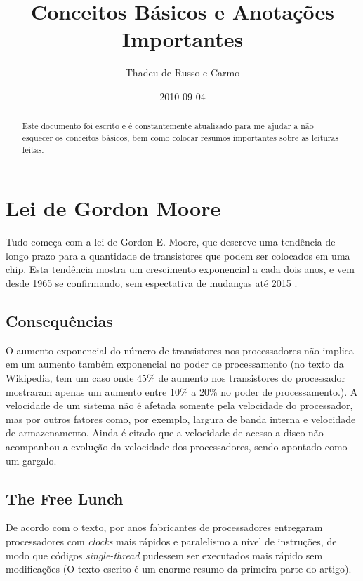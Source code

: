 \documentclass[]{article}
\title{Conceitos Básicos e Anotações Importantes}
\author{Thadeu de Russo e Carmo}
\date{2010-09-04}
\begin{document}
\ifpdf
{}
\else
{}
\fi

\maketitle


\begin{abstract}
	Este documento foi escrito e é constantemente atualizado para me ajudar a não esquecer os conceitos básicos, bem como
	colocar resumos importantes sobre as leituras feitas.
\end{abstract}

\section{Lei de Gordon Moore}
	\par Tudo começa com a lei de Gordon E. Moore, que descreve uma tendência de longo prazo para a quantidade de transistores
	que podem ser colocados em uma chip. Esta tendência mostra um crescimento exponencial a cada dois anos, e vem desde
	1965 se confirmando, sem espectativa de mudanças até 2015 \cite{Moore1965} \cite{MooreLaw}. 
	
	\subsection{Consequências}
	\par O aumento exponencial do número de transistores nos processadores não implica em um aumento também exponencial
	no poder
	de processamento (no texto da Wikipedia, tem um caso onde 45\% de aumento nos transistores do processador mostraram apenas
	um aumento entre 10\% a 20\% no poder de processamento.\cite{DothanInvestigated}). A velocidade de um sistema não é
	afetada somente pela velocidade do processador, mas por outros fatores como, por exemplo, largura de banda interna e
	velocidade de armazenamento. Ainda é citado que a velocidade de acesso a disco não acompanhou a evolução da velocidade
	dos processadores, sendo apontado como um gargalo.
	
	\subsection{The Free Lunch}
		\par De acordo com o texto, por anos fabricantes de processadores entregaram processadores com \textit{clocks} mais
		rápidos e paralelismo a nível de instruções, de modo que códigos \textit{single-thread} pudessem ser executados mais
		rápido sem modificações \cite{Shutter2005} (O texto escrito é um enorme resumo da primeira parte do artigo). 
\end{document}
